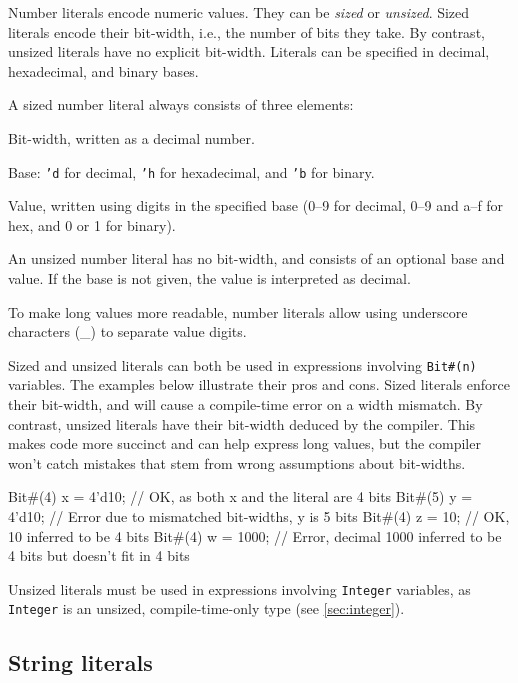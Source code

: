 Number literals encode numeric values. They can be \emph{sized} or \emph{unsized}.
Sized literals encode their bit-width, i.e., the number of bits they take.
By contrast, unsized literals have no explicit bit-width.
Literals can be specified in decimal, hexadecimal, and binary bases.

A sized number literal always consists of three elements:
\begin{compactenum}
\item Bit-width, written as a decimal number.
\item Base: \texttt{'d} for decimal, \texttt{'h} for hexadecimal, and \texttt{'b} for binary.
\item Value, written using digits in the specified base (0--9 for decimal, 0--9 and a--f for hex, and 0 or 1 for binary).
\end{compactenum}

An unsized number literal has no bit-width, and consists of an optional base and value.
If the base is not given, the value is interpreted as decimal.

To make long values more readable, number literals allow
using underscore characters (\_) to separate value digits.

Sized and unsized literals can both be used in expressions involving \verb|Bit#(n)| variables.
The examples below illustrate their pros and cons.
Sized literals enforce their bit-width, and will cause a compile-time error on a width mismatch.
By contrast, unsized literals have their bit-width deduced by the compiler.
This makes code more succinct and can help express long values,
but the compiler won't catch mistakes that stem from wrong assumptions about bit-widths.

\begin{mscode}
Bit#(4) x = 4'd10;  // OK, as both x and the literal are 4 bits
Bit#(5) y = 4'd10;  // Error due to mismatched bit-widths, y is 5 bits
Bit#(4) z = 10;     // OK, 10 inferred to be 4 bits
Bit#(4) w = 1000;   // Error, decimal 1000 inferred to be 4 bits but doesn't fit in 4 bits
\end{mscode}

Unsized literals must be used in expressions involving \verb|Integer| variables,
as \verb|Integer| is an unsized, compile-time-only type (see \autoref{sec:integer}).

\subsection{String literals}

